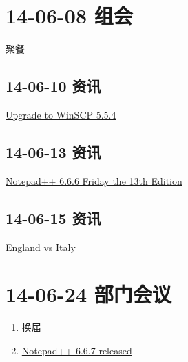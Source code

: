 \documentclass[]{report}
\begin{document}
\section{14-06-08 组会}
	聚餐~
	\subsection{14-06-10 资讯}
		\href{http://cdn.winscp.net/files/winscp554setup.exe}{Upgrade to WinSCP 5.5.4}
	\subsection{14-06-13 资讯}
		\href{http://notepad-plus-plus.org/zh/download/v6.6.6.html}{Notepad++ 6.6.6 Friday the 13th Edition}
	\subsection{14-06-15 资讯}
		England vs Italy
\section{14-06-24 部门会议}
\begin{enumerate}
	\item 换届
	\item \href{http://notepad-plus-plus.org/zh/download/v6.6.7.html}{Notepad++ 6.6.7 released}
\end{enumerate}
\end{document}
